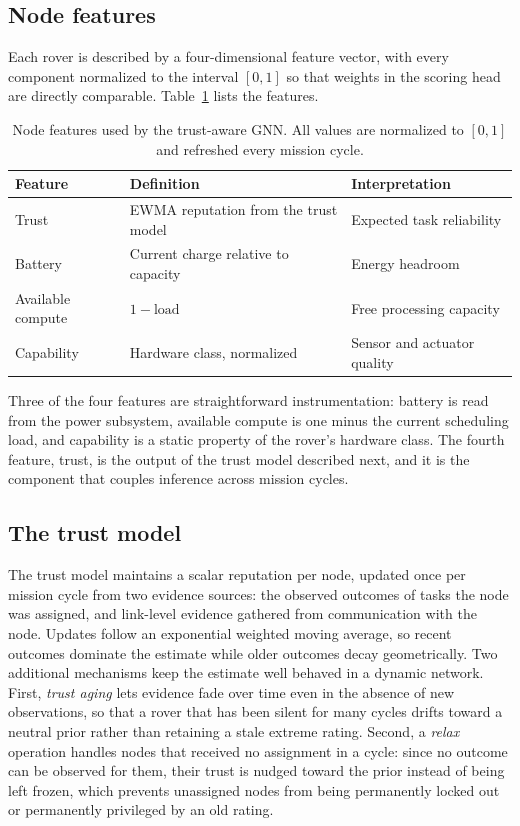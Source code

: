 \subsection{Node features}

Each rover is described by a four-dimensional feature vector, with every
component normalized to the interval $[0,1]$ so that weights in the scoring
head are directly comparable. Table~\ref{tab:nodefeatures} lists the
features.

\begin{table}[t]
  \centering
  \caption{Node features used by the trust-aware GNN. All values are
  normalized to $[0,1]$ and refreshed every mission cycle.}
  \label{tab:nodefeatures}
  \begin{tabular}{lll}
    \toprule
    Feature & Definition & Interpretation \\
    \midrule
    Trust & EWMA reputation from the trust model & Expected task reliability \\
    Battery & Current charge relative to capacity & Energy headroom \\
    Available compute & $1 - \text{load}$ & Free processing capacity \\
    Capability & Hardware class, normalized & Sensor and actuator quality \\
    \bottomrule
  \end{tabular}
\end{table}

Three of the four features are straightforward instrumentation: battery is
read from the power subsystem, available compute is one minus the current
scheduling load, and capability is a static property of the rover's hardware
class. The fourth feature, trust, is the output of the trust model described
next, and it is the component that couples inference across mission cycles.

\subsection{The trust model}

The trust model maintains a scalar reputation per node, updated once per
mission cycle from two evidence sources: the observed outcomes of tasks the
node was assigned, and link-level evidence gathered from communication with
the node. Updates follow an exponential weighted moving average, so recent
outcomes dominate the estimate while older outcomes decay geometrically. Two
additional mechanisms keep the estimate well behaved in a dynamic network.
First, \emph{trust aging} lets evidence fade over time even in the absence
of new observations, so that a rover that has been silent for many cycles
drifts toward a neutral prior rather than retaining a stale extreme rating.
Second, a \emph{relax} operation handles nodes that received no assignment
in a cycle: since no outcome can be observed for them, their trust is
nudged toward the prior instead of being left frozen, which prevents
unassigned nodes from being permanently locked out or permanently
privileged by an old rating.

